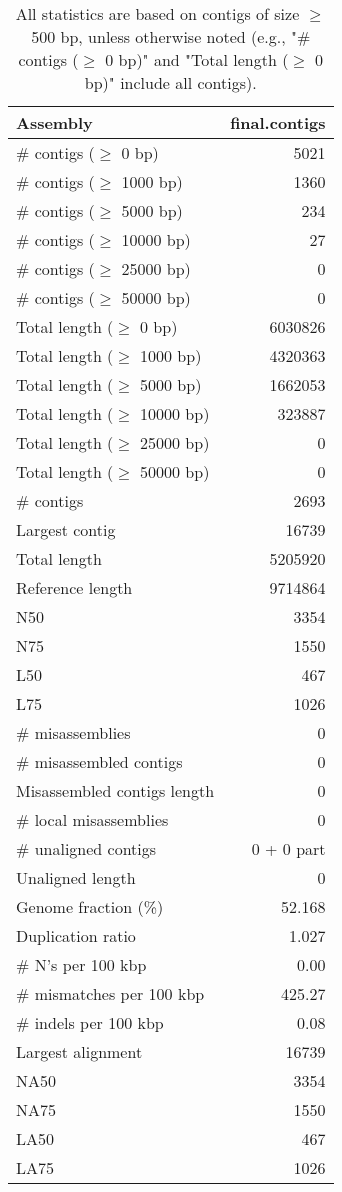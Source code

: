 \documentclass[12pt,a4paper]{article}
\begin{document}
\begin{table}[ht]
\begin{center}
\caption{All statistics are based on contigs of size $\geq$ 500 bp, unless otherwise noted (e.g., "\# contigs ($\geq$ 0 bp)" and "Total length ($\geq$ 0 bp)" include all contigs).}
\begin{tabular}{|l*{1}{|r}|}
\hline
Assembly & final.contigs \\ \hline
\# contigs ($\geq$ 0 bp) & 5021 \\ \hline
\# contigs ($\geq$ 1000 bp) & 1360 \\ \hline
\# contigs ($\geq$ 5000 bp) & 234 \\ \hline
\# contigs ($\geq$ 10000 bp) & 27 \\ \hline
\# contigs ($\geq$ 25000 bp) & 0 \\ \hline
\# contigs ($\geq$ 50000 bp) & 0 \\ \hline
Total length ($\geq$ 0 bp) & 6030826 \\ \hline
Total length ($\geq$ 1000 bp) & 4320363 \\ \hline
Total length ($\geq$ 5000 bp) & 1662053 \\ \hline
Total length ($\geq$ 10000 bp) & 323887 \\ \hline
Total length ($\geq$ 25000 bp) & 0 \\ \hline
Total length ($\geq$ 50000 bp) & 0 \\ \hline
\# contigs & 2693 \\ \hline
Largest contig & 16739 \\ \hline
Total length & 5205920 \\ \hline
Reference length & 9714864 \\ \hline
N50 & 3354 \\ \hline
N75 & 1550 \\ \hline
L50 & 467 \\ \hline
L75 & 1026 \\ \hline
\# misassemblies & 0 \\ \hline
\# misassembled contigs & 0 \\ \hline
Misassembled contigs length & 0 \\ \hline
\# local misassemblies & 0 \\ \hline
\# unaligned contigs & 0 + 0 part \\ \hline
Unaligned length & 0 \\ \hline
Genome fraction (\%) & 52.168 \\ \hline
Duplication ratio & 1.027 \\ \hline
\# N's per 100 kbp & 0.00 \\ \hline
\# mismatches per 100 kbp & 425.27 \\ \hline
\# indels per 100 kbp & 0.08 \\ \hline
Largest alignment & 16739 \\ \hline
NA50 & 3354 \\ \hline
NA75 & 1550 \\ \hline
LA50 & 467 \\ \hline
LA75 & 1026 \\ \hline
\end{tabular}
\end{center}
\end{table}
\end{document}
